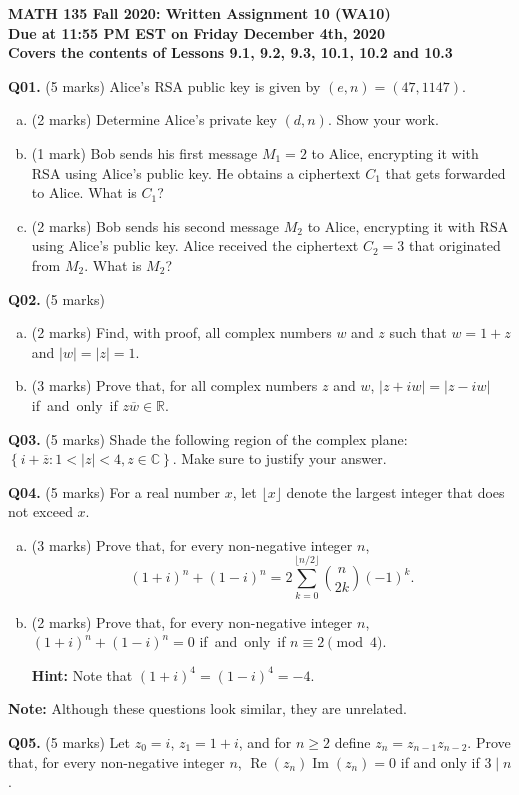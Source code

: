 \documentclass[11pt]{article}
\begin{document}
\parindent=0pt

\textbf{MATH 135 Fall 2020: Written Assignment 10 (WA10)\\Due at 11:55 PM EST on Friday December 4th, 2020\\Covers the contents of Lessons 9.1, 9.2, 9.3, 10.1, 10.2 and 10.3}

\textbf{Q01.} (5 marks) Alice's RSA public key is given by $(e, n) = (47, 1147)$.

\begin{enumerate}[(a)]
\item (2 marks) Determine Alice's private key $(d, n)$. Show your work.

\item (1 mark) Bob sends his first message $M_1 = 2$ to Alice, encrypting it with RSA using Alice's public key. He obtains a ciphertext $C_1$ that gets forwarded to Alice. What is $C_1$?

\item (2 marks) Bob sends his second message $M_2$ to Alice, encrypting it with RSA using Alice's public key. Alice received the ciphertext $C_2 = 3$ that originated from $M_2$. What is $M_2$?
\end{enumerate}

\textbf{Q02.} (5 marks)

\begin{enumerate}[(a)]
\item (2 marks) Find, with proof, all complex numbers $w$ and $z$ such that $w = 1 + z$ and $|w| = |z| = 1$.

\item (3 marks) Prove that, for all complex numbers $z$ and $w$, $|z + iw| = |z - iw|$ \mbox{if and only if} $z\overline{w} \in \mathbb R$.
\end{enumerate}

\textbf{Q03.} (5 marks) Shade the following region of the complex plane: \mbox{$\left\{i + \overline z \colon 1 < |z| < 4, z \in \mathbb C\right\}$}. Make sure to justify your answer.

\textbf{Q04.} (5 marks) For a real number $x$, let $\lfloor x\rfloor$ denote the largest integer that does not exceed $x$.

\begin{enumerate}[(a)]
\item (3 marks) Prove that, for every non-negative integer $n$,
%
$$
(1 + i)^n + (1 - i)^n = 2\sum\limits_{k = 0}^{\lfloor n/2\rfloor} \binom{n}{2k}(-1)^k.
$$

\item (2 marks) Prove that, for every non-negative integer $n$, $(1 + i)^n + (1 - i)^n = 0$ \mbox{if and only if} $n \equiv 2 \pmod 4$.

\textbf{Hint:} Note that $(1 + i)^4 = (1 - i)^4 = -4$.
\end{enumerate}

\textbf{Note:} Although these questions look similar, they are unrelated.

\textbf{Q05.} (5 marks) Let $z_0 = i$, $z_1 = 1 + i$, and for $n \geq 2$ define $z_n = z_{n - 1}z_{n - 2}$. Prove that, for every non-negative integer $n$, $\operatorname{Re}(z_n)\operatorname{Im}(z_n) = 0$ if and only if $3 \mid n$.
\end{document}

